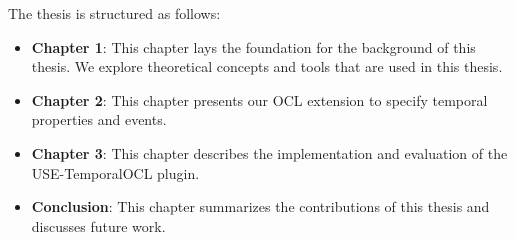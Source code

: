 The thesis is structured as follows:
\begin{itemize}
  \item \textbf{Chapter 1}: This chapter lays the foundation for the background of this thesis.
  We explore theoretical concepts and tools that are used in this thesis.
  
  \item \textbf{Chapter 2}: This chapter presents our OCL extension to specify temporal properties and events.

  \item \textbf{Chapter 3}: This chapter describes the implementation and evaluation of the USE-TemporalOCL plugin. 

  \item \textbf{Conclusion}: This chapter summarizes the contributions of this thesis and discusses future work.
\end{itemize}






